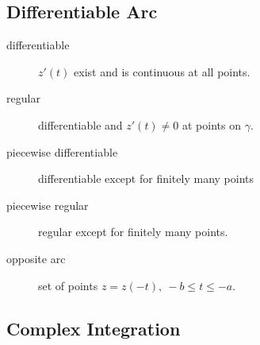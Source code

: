 \subsection{Differentiable Arc}

\begin{description}
	\item[differentiable] $z'(t)$ exist and is continuous at all points.
	\item[regular] differentiable and $z'(t) \ne 0$ at points on $\gamma$.
	\item[piecewise differentiable] differentiable except for finitely many points
	\item[piecewise regular] regular except for finitely many points.
	\item[opposite arc] set of points $z = z(-t),\ -b \le t \le -a$.
\end{description}


\subsection{Complex Integration}


